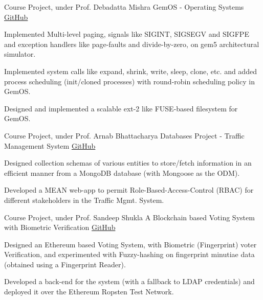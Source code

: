\begin{cventries}
  \cventry
  {Course Project, under Prof. Debadatta Mishra}
  {GemOS - Operating Systems}
  {\href{https://github.com/mayanksha/CS330}{\faGithubSquare\acvHeaderIconSep GitHub}}
  {}
  {
    \begin{cvitems}
    \item Implemented Multi-level paging, signals like SIGINT, SIGSEGV and SIGFPE and exception handlers like page-faults and divide-by-zero, on gem5 architectural simulator.
    \item Implemented system calls like expand, shrink, write, sleep, clone, etc. and added process scheduling (init/cloned processes) with round-robin scheduling policy in GemOS.
    \item Designed and implemented a scalable ext-2 like FUSE-based filesystem for GemOS.
    \end{cvitems}
  }

  \cventry
  {Course Project, under Prof. Arnab Bhattacharya}
  {Databases Project - Traffic Management System}
  {\href{https://github.com/mayanksha/cs315-traffic-mgmt/blob/master/report.pdf}{\faGithubSquare\acvHeaderIconSep GitHub}}
  {}
  {
    \begin{cvitems}
    \item Designed collection schemas of various entities to store/fetch information in an efficient manner from a MongoDB database (with Mongoose as the ODM).
    \item Developed a MEAN web-app to permit Role-Based-Access-Control (RBAC) for different stakeholders in the Traffic Mgmt. System.
    \end{cvitems}
  }

  \cventry
  {Course Project, under Prof. Sandeep Shukla}
  {A Blockchain based Voting System with Biometric Verification}
  {\href{https://github.com/mayanksha/blockchain/tree/master/Project}{\faGithubSquare\acvHeaderIconSep GitHub}}
  {}
  {
    \begin{cvitems}
    \item Designed an Ethereum based Voting System, with Biometric (Fingerprint) voter Verification, and experimented with Fuzzy-hashing on fingerprint minutiae data (obtained using a Fingerprint Reader).
    \item Developed a back-end for the system (with a fallback to LDAP credentials) and deployed it over the Ethereum Ropsten Test Network.
    \end{cvitems}
  }


\end{cventries}
